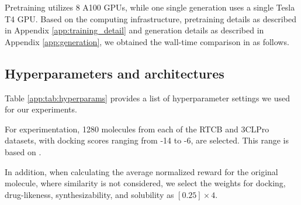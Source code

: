 {Pretraining utilizes 8 A100 GPUs, while one single generation uses a single Tesla T4 GPU. Based on the computing infrastructure, {pretraining details as described in Appendix \ref{app:training_detail} and generation details as described in Appendix \ref{app:generation}}, we obtained the wall-time comparison in  as follows.}


 \begin{table*}[ht!]
 {
    \centering
    {\scriptsize
    }
    \caption{{Wall-time comparison between different methods.} }
        \label{table:wall-time}   
        }
\end{table*}


\subsection{{Hyperparameters and architectures}}\label{app:hyperparameters}
Table \ref{app:tab:hyperparams} provides a list of hyperparameter settings we used for our experiments.

{For experimentation, 1280 molecules from each of the RTCB and 3CLPro datasets, with docking scores ranging from -14 to -6, are selected. This range is based on \citep{liu2024erp}.}


{In addition, when calculating the average normalized reward for the original molecule, where similarity is not considered, we select the weights for docking, drug-likeness, synthesizability, and solubility as $[0.25] \times 4$.}


